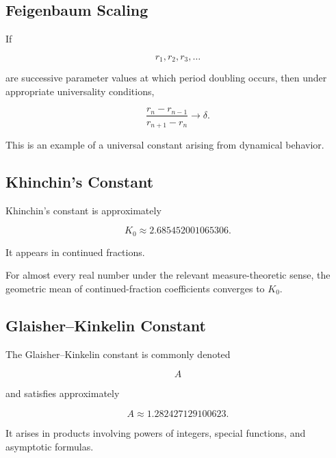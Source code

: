 \subsection{Feigenbaum Scaling}
\label{subsec:feigenbaum-scaling}

If

\[
r_1,r_2,r_3,\ldots
\]

are successive parameter values at which period doubling occurs, then under
appropriate universality conditions,

\[
\boxed{
\frac{
r_{n}-r_{n-1}
}{
r_{n+1}-r_n
}
\to
\delta.
}
\]

This is an example of a universal constant arising from dynamical behavior.

\subsection{Khinchin's Constant}
\label{subsec:khinchin-constant-reference}

Khinchin's constant is approximately

\[
\boxed{
K_0
\approx
2.685452001065306.
}
\]

It appears in continued fractions.

For almost every real number under the relevant measure-theoretic sense, the
geometric mean of continued-fraction coefficients converges to \(K_0\).

\subsection{Glaisher--Kinkelin Constant}
\label{subsec:glaisher-kinkelin-reference}

The Glaisher--Kinkelin constant is commonly denoted

\[
\boxed{
A
}
\]

and satisfies approximately

\[
\boxed{
A
\approx
1.282427129100623.
}
\]

It arises in products involving powers of integers, special functions, and
asymptotic formulas.

